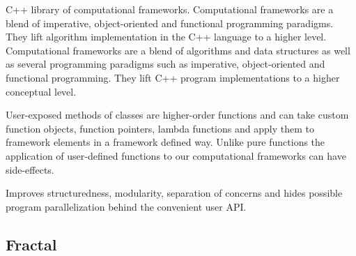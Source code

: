 C++ library of computational frameworks. Computational frameworks are a blend of imperative, object-oriented and functional programming paradigms. They lift algorithm implementation in the C++ language to a higher level.
Computational frameworks are a blend of algorithms and data structures as well as several programming paradigms such as imperative, object-oriented and functional programming. They lift C++ program implementations to a higher conceptual level. 

User-exposed methods of classes are higher-order functions and can take custom function objects, function pointers, lambda functions and apply them to framework elements in a framework defined way. Unlike pure functions the application of user-defined functions to our computational frameworks can have side-effects.

\quad Improves structuredness, modularity, separation of concerns and hides possible program parallelization behind the convenient user API.  

\subsection{Fractal}
\label{frameworks_fractal}
